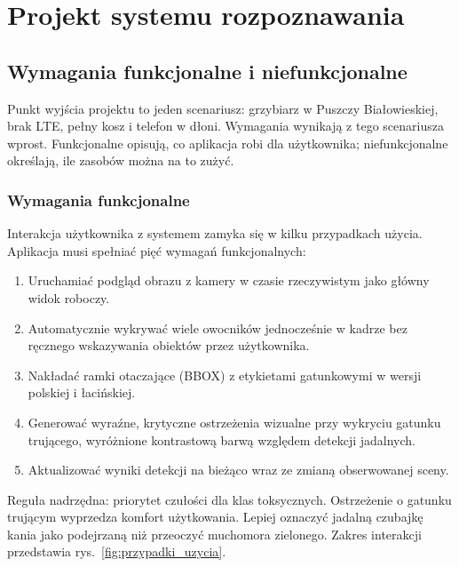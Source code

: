 \chapter{Projekt systemu rozpoznawania}\label{chap:projekt_systemu}
\section{Wymagania funkcjonalne i niefunkcjonalne}
Punkt wyjścia projektu to jeden scenariusz: grzybiarz w Puszczy Białowieskiej, brak LTE, pełny kosz i telefon w dłoni. Wymagania wynikają z tego scenariusza wprost. Funkcjonalne opisują, co aplikacja robi dla użytkownika; niefunkcjonalne określają, ile zasobów można na to zużyć.

\subsection{Wymagania funkcjonalne}
Interakcja użytkownika z systemem zamyka się w kilku przypadkach użycia. Aplikacja musi spełniać pięć wymagań funkcjonalnych:
\begin{enumerate}
 \item Uruchamiać podgląd obrazu z kamery w czasie rzeczywistym jako główny widok roboczy.
 \item Automatycznie wykrywać wiele owocników jednocześnie w kadrze bez ręcznego wskazywania obiektów przez użytkownika.
 \item Nakładać ramki otaczające (BBOX) z etykietami gatunkowymi w wersji polskiej i łacińskiej.
 \item Generować wyraźne, krytyczne ostrzeżenia wizualne przy wykryciu gatunku trującego, wyróżnione kontrastową barwą względem detekcji jadalnych.
 \item Aktualizować wyniki detekcji na bieżąco wraz ze zmianą obserwowanej sceny.
\end{enumerate}
Reguła nadrzędna: priorytet czułości dla klas toksycznych. Ostrzeżenie o gatunku trującym wyprzedza komfort użytkowania. Lepiej oznaczyć jadalną czubajkę kania jako podejrzaną niż przeoczyć muchomora zielonego. Zakres interakcji przedstawia rys.~\ref{fig:przypadki_uzycia}.

